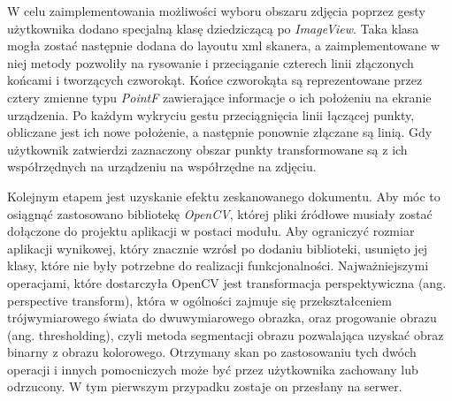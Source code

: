 \documentclass[10pt,twoside,a4paper]{report}
\begin{document}
\par W celu zaimplementowania możliwości wyboru obszaru zdjęcia poprzez gesty użytkownika dodano specjalną klasę dziedziczącą po \textit{ImageView}. Taka klasa mogła zostać następnie dodana do layoutu xml skanera, a zaimplementowane w niej metody pozwoliły na rysowanie i przeciąganie czterech linii złączonych końcami i tworzących czworokąt. Końce czworokąta są reprezentowane przez cztery zmienne typu \textit{PointF} zawierające informacje o ich położeniu na ekranie urządzenia. Po każdym wykryciu gestu przeciągnięcia linii łączącej punkty, obliczane jest ich nowe położenie, a następnie ponownie złączane są linią. Gdy użytkownik zatwierdzi zaznaczony obszar punkty transformowane są z ich współrzędnych na urządzeniu na współrzędne na zdjęciu.

\par Kolejnym etapem jest uzyskanie efektu zeskanowanego dokumentu. Aby móc to osiągnąć zastosowano bibliotekę \textit{OpenCV}\cite{OpenCV}, której pliki źródłowe musiały zostać dołączone do projektu aplikacji w postaci modułu. Aby ograniczyć rozmiar aplikacji wynikowej, który znacznie wzrósł po dodaniu biblioteki, usunięto jej klasy, które nie były potrzebne do realizacji funkcjonalności. Najważniejszymi operacjami, które dostarczyła OpenCV jest transformacja perspektywiczna (ang. perspective transform), która w ogólności zajmuje się przekształceniem trójwymiarowego świata do dwuwymiarowego obrazka, oraz progowanie obrazu (ang. thresholding), czyli metoda segmentacji obrazu pozwalająca uzyskać obraz binarny z obrazu kolorowego. Otrzymany skan po zastosowaniu tych dwóch operacji i innych pomocniczych może być przez użytkownika zachowany lub odrzucony. W tym pierwszym przypadku zostaje on przesłany na serwer.
\end{document}

